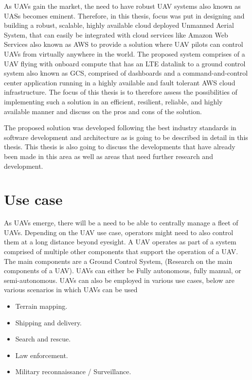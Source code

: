 As UAVs gain the market, the need to have robust UAV systems also known as UASs becomes eminent. Therefore, in this thesis, focus was put in designing and building a robust, scalable, highly available cloud deployed Unmanned Aerial System, that can easily be integrated with cloud services like Amazon Web Services also known as AWS to provide a solution where UAV pilots can control UAVs from virtually anywhere in the world. The proposed system comprises of a UAV flying with onboard compute that has an LTE datalink to a ground control system also known as GCS, comprised of dashboards and a command-and-control center application running in a highly available and fault tolerant AWS cloud infrastructure. The focus of this thesis is to therefore assess the possibilities of implementing such a solution in an efficient, resilient, reliable, and highly available manner and discuss on the pros and cons of the solution.

The proposed solution was developed following the best industry standards in software development and architecture as is going to be described in detail in this thesis. This thesis is also going to discuss the developments that have already been made in this area as well as areas that need further research and development.


\section{Use case}

As UAVs emerge, there will be a need to be able to centrally manage a fleet of UAVs. Depending on the UAV use case, operators might need to also control them at a long distance beyond eyesight. A UAV operates as part of a system comprised of multiple other components that support the operation of a UAV. The main components are a Ground Control System, (Research on the main components of a UAV). UAVs can either be Fully autonomous, fully manual, or semi-autonomous. UAVs can also be employed in various use cases, below are various scenarios in which UAVs can be used
\begin{itemize}
    \item Terrain mapping.
    \item Shipping and delivery.
    \item Search and rescue.
    \item Law enforcement.
    \item Military reconnaissance / Surveillance.
\end{itemize}


